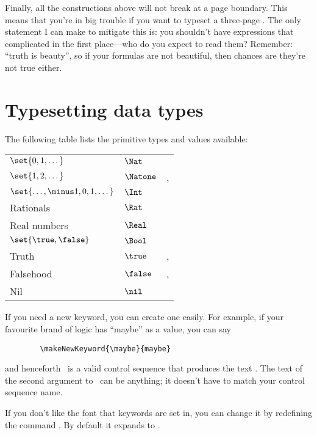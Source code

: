 \documentclass{article}
\newenvironment{dangerous}{\par\vspace{5pt}\bgroup\small\noindent}%
                          {\par\egroup\vspace{5pt}}
\renewcommand{\^}[1]{$\langle${\rm #1\/}$\rangle$}
\newcommand{\cs}[1]{\leavevmode\hbox{\tt \string#1}}
\begin{document}
Finally, all the constructions above will not break at a page
boundary.  This means that you're in big trouble if you want to
typeset a three-page \cs\Cases.  The only statement I can make to
mitigate this is: you shouldn't have expressions that complicated in
the first place---who do you expect to read them?  Remember: ``truth
is beauty'', so if your formulas are not beautiful, then chances are
they're not true either.





\section{Typesetting data types}

The following table lists the primitive types and values available:

\begin{center}
\begin{tabular}{|l|l|l|}
\hline
$\set{0,1,\dots}$       & $\Nat$        & \cs\Nat       \\
$\set{1,2,\dots}$       & $\Natone$     & \cs\Natone,\cs\Nati   \\
$\set{\dots,\minus1,0,1,\dots}$& $\Int$ & \cs\Int       \\
Rationals               & $\Rat$        & \cs\Rat       \\
Real numbers            & $\Real$       & \cs\Real      \\
$\set{\true,\false}$    & $\Bool$       & \cs\Bool      \\
Truth                   & $\true$       & \cs\true,\cs\True \\
Falsehood               & $\false$      & \cs\false,\cs\False\\
Nil                     & $\nil$        & \cs\nil       \\
\hline
\end{tabular}
\end{center}

If you need a new keyword, you can create one easily.  For example, if
your favourite brand of logic has ``maybe'' as a value, you can say
\begin{verbatim}
        \makeNewKeyword{\maybe}{maybe}
\end{verbatim}
and henceforth \cs\maybe\ is a valid control sequence that produces
the text .  The text of the second argument to
\cs\makeNewKeyword\ can be anything; it doesn't have to match your
control sequence name.
\begin{dangerous}
If you don't like the font that keywords are set in, you can change
it by redefining the command \cs\keywordFontBeginSequence.  By
default it expands to \cs\sf.
\end{dangerous}
\end{document}
